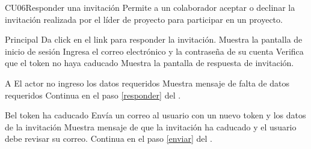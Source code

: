
% 



	\begin{UseCase}{CU06}{Responder una invitación}{
		Permite a un colaborador aceptar o declinar la invitación realizada por el líder de proyecto para participar en un proyecto.
	}
	\end{UseCase}
	\begin{UCtrayectoria}{Principal}
		\UCpaso[\UCactor]Da click en el link para responder la invitación.\label{enviar}
       \UCpaso Muestra la pantalla de inicio de sesión
      \UCpaso[\UCactor] Ingresa el correo electrónico y la contraseña de su cuenta   \label{responder}
     \UCpaso Verifica que el token no haya caducado
       \UCpaso   Muestra la pantalla de respuesta de invitación.
	\end{UCtrayectoria}

		\begin{UCtrayectoriaA}{A}{ El actor no ingreso los datos requeridos}
			\UCpaso Muestra mensaje de falta de datos requeridos
			\UCpaso Continua en el paso \ref{responder} del .
		\end{UCtrayectoriaA}
        
        
		\begin{UCtrayectoriaA}{B}{el token ha caducado}
			\UCpaso Envía un correo al usuario con un nuevo token y los datos de la invitación
			\UCpaso Muestra mensaje de que la invitación ha caducado y el usuario debe revisar su correo.
			\UCpaso Continua en el paso \ref{enviar} del .
		\end{UCtrayectoriaA}
		
		
